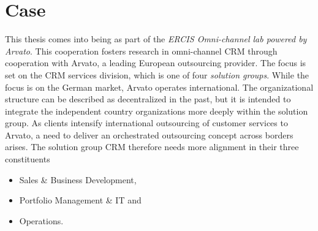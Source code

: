 \chapter{Case}
This thesis comes into being as part of the \textit{ERCIS Omni-channel lab powered by Arvato}. This cooperation fosters research in omni-channel CRM through cooperation with Arvato, a leading European outsourcing provider. The focus is set on the CRM services division, which is one of four \textit{solution groups}. While the focus is on the German market, Arvato operates international. The organizational structure can be described as decentralized in the past, but it is intended to integrate the independent country organizations more deeply within the solution group. As clients intensify international outsourcing of customer services to Arvato, a need to deliver an orchestrated outsourcing concept across borders arises. The solution group CRM therefore needs more alignment in their three constituents

\begin{itemize}
	\item Sales \& Business Development,
	\item Portfolio Management \& IT and
	\item Operations.
\end{itemize}

